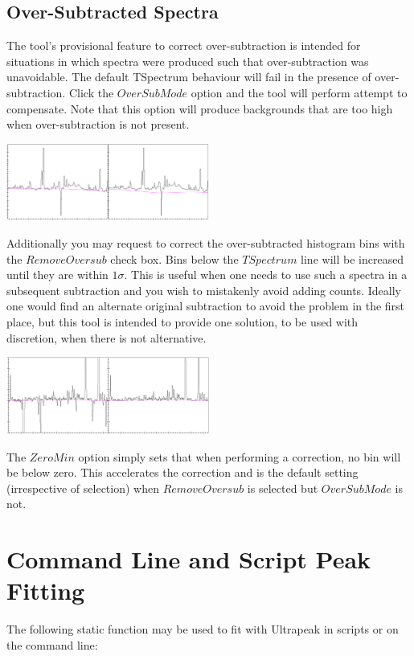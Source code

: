 \documentclass[a4paper,10pt]{article}
\begin{document}
\subsection{Over-Subtracted Spectra}
The tool's provisional feature to correct over-subtraction is intended for situations in which spectra were produced such that over-subtraction was unavoidable. The default TSpectrum behaviour will fail in the presence of over-subtraction. Click the $OverSubMode$ option and the tool will perform attempt to compensate. Note that this option will produce backgrounds that are too high when over-subtraction is not present.
\begin{center}
\includegraphics[width=0.5\textwidth]{TSpectrum2.png}
\end{center}
Additionally you may request to correct the over-subtracted histogram bins with the $Remove Oversub$ check box. Bins below the $TSpectrum$ line will be increased until they are within $1\sigma$. This is useful when one needs to use such a spectra in a subsequent subtraction and you wish to mistakenly avoid adding counts. Ideally one would find an alternate original subtraction to avoid the problem in the first place, but this tool is intended to provide one  solution, to be used with discretion, when there is not alternative.
\begin{center}
\includegraphics[width=0.5\textwidth]{TSpectrum3.png}
\end{center}
The $ZeroMin$ option simply sets that when performing a correction, no bin will be below zero. This accelerates the correction and is the default setting (irrespective of selection) when $Remove Oversub$ is selected but $OverSubMode$ is not.


\section{Command Line and Script Peak Fitting}
The following static function may be used to fit with Ultrapeak in scripts or on the command line:
\end{document}
